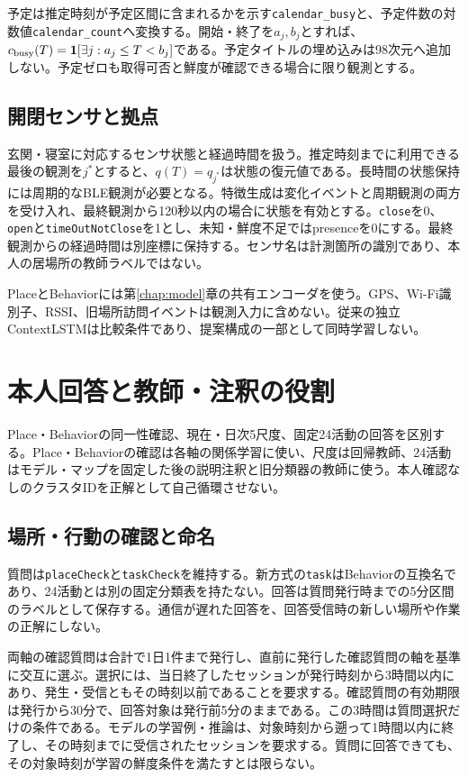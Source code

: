 予定は推定時刻が予定区間に含まれるかを示す\texttt{calendar\_busy}と、予定件数の対数値\texttt{calendar\_count}へ変換する。開始・終了を\(a_j,b_j\)とすれば、\(c_{\rm busy}(T)=\mathbf1[\exists j:a_j\le T<b_j]\)である。予定タイトルの埋め込みは98次元へ追加しない。予定ゼロも取得可否と鮮度が確認できる場合に限り観測とする。

\subsection{開閉センサと拠点}

玄関・寝室に対応するセンサ状態と経過時間を扱う。推定時刻までに利用できる最後の観測を\(j^*\)とすると、\(q(T)=q_{j^*}\)は状態の復元値である。長時間の状態保持には周期的なBLE観測が必要となる。特徴生成は変化イベントと周期観測の両方を受け入れ、最終観測から120秒以内の場合に状態を有効とする。\texttt{close}を0、\texttt{open}と\texttt{timeOutNotClose}を1とし、未知・鮮度不足ではpresenceを0にする。最終観測からの経過時間は別座標に保持する。センサ名は計測箇所の識別であり、本人の居場所の教師ラベルではない。

PlaceとBehaviorには第\ref{chap:model}章の共有エンコーダを使う。GPS、Wi-Fi識別子、RSSI、旧場所訪問イベントは観測入力に含めない。従来の独立ContextLSTMは比較条件であり、提案構成の一部として同時学習しない。

\section{本人回答と教師・注釈の役割}

Place・Behaviorの同一性確認、現在・日次5尺度、固定24活動の回答を区別する。Place・Behaviorの確認は各軸の関係学習に使い、尺度は回帰教師、24活動はモデル・マップを固定した後の説明注釈と旧分類器の教師に使う。本人確認なしのクラスタIDを正解として自己循環させない。

\subsection{場所・行動の確認と命名}
\label{sec:context-confirmations}

質問は\texttt{placeCheck}と\texttt{taskCheck}を維持する。新方式の\texttt{task}はBehaviorの互換名であり、24活動とは別の固定分類表を持たない。回答は質問発行時までの5分区間のラベルとして保存する。通信が遅れた回答を、回答受信時の新しい場所や作業の正解にしない。

両軸の確認質問は合計で1日1件まで発行し、直前に発行した確認質問の軸を基準に交互に選ぶ。選択には、当日終了したセッションが発行時刻から3時間以内にあり、発生・受信ともその時刻以前であることを要求する。確認質問の有効期限は発行から30分で、回答対象は発行前5分のままである。この3時間は質問選択だけの条件である。モデルの学習例・推論は、対象時刻から遡って1時間以内に終了し、その時刻までに受信されたセッションを要求する。質問に回答できても、その対象時刻が学習の鮮度条件を満たすとは限らない。

